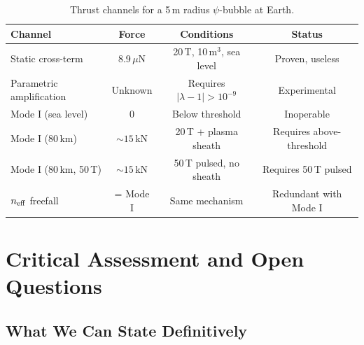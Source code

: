 \documentclass[12pt,letterpaper]{article}
\begin{document}
\begin{table}[h]
\centering
\caption{Thrust channels for a 5\,m radius $\psi$-bubble at Earth.}
\label{tab:channels}
\begin{tabular}{@{}lccc@{}}
\toprule
Channel & Force & Conditions & Status \\
\midrule
Static cross-term & 8.9\,$\mu$N & 20\,T, 10\,m$^3$, sea level & Proven, useless \\
Parametric amplification & Unknown & Requires $|\lambda - 1| > 10^{-9}$ & Experimental \\
Mode I (sea level) & 0 & Below threshold & Inoperable \\
Mode I (80\,km) & $\sim 15$\,kN & 20\,T + plasma sheath & Requires above-threshold \\
Mode I (80\,km, 50\,T) & $\sim 15$\,kN & 50\,T pulsed, no sheath & Requires 50\,T pulsed \\
$n_{\rm eff}$ freefall & = Mode I & Same mechanism & Redundant with Mode I \\
\bottomrule
\end{tabular}
\end{table}

\section{Critical Assessment and Open Questions}
\label{sec:assessment}

\subsection{What We Can State Definitively}
\end{document}
